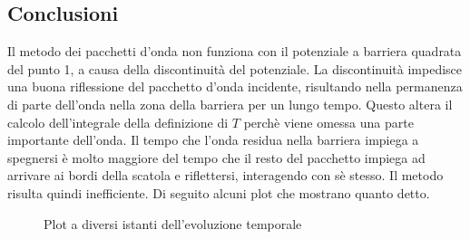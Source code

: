 \newpage
\subsection*{Conclusioni}
Il metodo dei pacchetti d'onda non funziona con il potenziale a barriera quadrata
del punto 1, a causa della discontinuità del potenziale. La discontinuità
impedisce una buona riflessione del pacchetto d'onda incidente, risultando nella
permanenza di parte dell'onda nella zona della barriera per un lungo tempo.
Questo altera il calcolo dell'integrale della definizione di $T$ perchè
viene omessa una parte importante dell'onda. Il tempo che l'onda residua nella barriera
impiega a spegnersi è molto maggiore del tempo che il resto del pacchetto impiega
ad arrivare ai bordi della scatola e riflettersi, interagendo con sè stesso.
Il metodo risulta quindi inefficiente. Di seguito alcuni plot che mostrano
quanto detto.

\begin{figure}[h]
	\begin{subfigure}
		{
			\texttt{[image: square\_transmission1.eps]}
			\texttt{[image: square\_transmission2.eps]}
	 	}
	\end{subfigure}
	\begin{subfigure}
		{
			\texttt{[image: square\_transmission3.eps]}
		}
	\end{subfigure}
	\caption{Plot a diversi istanti dell'evoluzione temporale}
\end{figure}